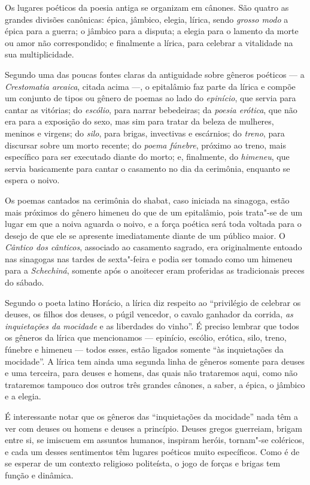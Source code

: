 Os lugares poéticos da poesia antiga se organizam em cânones. São quatro
as grandes divisões canônicas: épica, jâmbico, elegia, lírica, sendo
\emph{grosso modo} a épica para a guerra; o jâmbico para a disputa; a
elegia para o lamento da morte ou amor não correspondido; e finalmente a
lírica, para celebrar a vitalidade na sua multiplicidade.

Segundo uma das poucas fontes claras da antiguidade sobre gêneros
poéticos --- a \emph{Crestomatia arcaica}, citada acima ---, o
epitalâmio faz parte da lírica e compõe um conjunto de tipos ou gênero
de poemas ao lado do \emph{epinício}, que servia para cantar as
vitórias; do \emph{escólio}, para narrar bebedeiras; da \emph{poesia
erótica}, que não era para a exposição do sexo, mas sim para tratar da
beleza de mulheres, meninos e virgens; do \emph{silo}, para brigas,
invectivas e escárnios; do \emph{treno}, para discursar sobre um morto
recente; do \emph{poema fúnebre}, próximo ao treno, mais específico para
ser executado diante do morto; e, finalmente, do \emph{himeneu}, que
servia basicamente para cantar o casamento no dia da cerimônia,
enquanto se espera o noivo.

Os poemas cantados na cerimônia do shabat, caso iniciada na sinagoga,
estão mais próximos do gênero himeneu do que de um epitalâmio, pois
trata"-se de um lugar em que a noiva aguarda o noivo, e a força poética
será toda voltada para o desejo de que ele se apresente imediatamente
diante de um público maior. O \emph{Cântico dos cânticos}, associado ao
casamento sagrado, era originalmente entoado nas sinagogas nas tardes de
sexta"-feira e podia ser tomado como um himeneu para a \emph{Schechiná},
somente após o anoitecer eram proferidas as tradicionais preces do
sábado.

Segundo o poeta latino Horácio, a lírica diz respeito ao ``privilégio de
celebrar os deuses, os filhos dos deuses, o púgil vencedor, o cavalo
ganhador da corrida, \emph{as inquietações da mocidade} e as liberdades
do vinho''. É preciso lembrar que todos os gêneros da lírica que
mencionamos --- epinício, escólio, erótica, silo, treno, fúnebre e
himeneu --- todos esses, estão ligados somente ``às inquietações da
mocidade''. A lírica tem ainda uma segunda linha de gêneros somente para
deuses e uma terceira, para deuses e homens, das quais não trataremos
aqui, como não trataremos tampouco dos outros três grandes cânones, a
saber, a épica, o jâmbico e a elegia.

É interessante notar que os gêneros das ``inquietações da mocidade'' nada
têm a ver com deuses ou homens e deuses a princípio. Deuses gregos
guerreiam, brigam entre si, se imiscuem em assuntos humanos, inspiram
heróis, tornam"-se coléricos, e cada um desses sentimentos têm lugares
poéticos muito específicos. Como é de se esperar de um contexto
religioso politeísta, o jogo de forças e brigas tem função e dinâmica.


